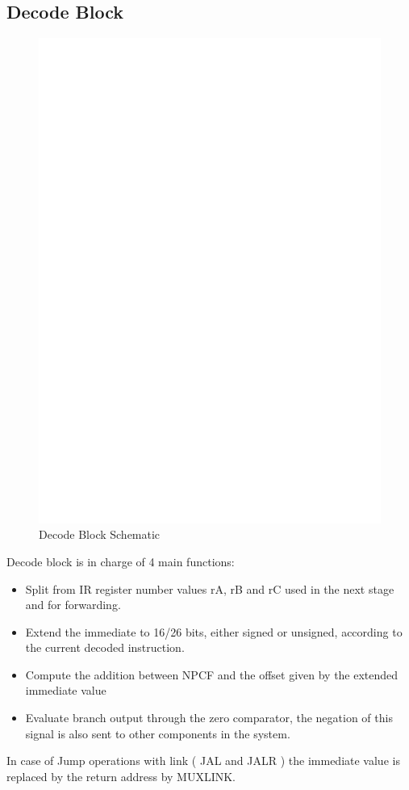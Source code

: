 \documentclass[12pt]{article}
\begin{document}
\subsection{Decode Block}
\begin{figure}[h!]
	\includegraphics[width=\textwidth, center]{images/DECODE_BLOCK.eps}
	\caption{Decode Block Schematic}
	\label{DECODEBLOCK}
\end{figure}
Decode block is in charge of 4 main functions:
\begin{itemize}
	\item Split from IR register number values rA, rB and rC used in the next stage and for forwarding.
	\item Extend the immediate to 16/26 bits, either signed or unsigned, according to the current decoded instruction.
	\item Compute the addition between NPCF and the offset given by the extended immediate value
	\item Evaluate branch output through the zero comparator, the negation of this signal is also sent to other components in the system.
\end{itemize}
In case of Jump operations with link ( JAL and JALR ) the immediate value is replaced by the return address by MUXLINK.
\end{document}
